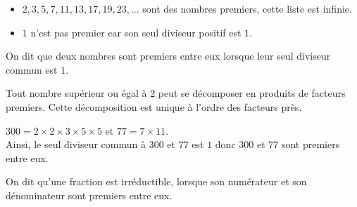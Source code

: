 \begin{Exemple}
\leavevmode\vspace{-\baselineskip}
\begin{itemize}[label=\textcolor{Couleur8}{$\bullet$}]
\item $2,3,5,7,11,13,17,19,23,...$ sont des nombres premiers, cette liste est infinie.
\item $1$ n'est pas premier car son seul diviseur positif est $1$.
\end{itemize}
\end{Exemple}

\begin{Définition}
On dit que deux nombres sont premiers entre eux lorsque leur seul
diviseur commun est $1$.
\end{Définition}

\newpage

\begin{Propriété}
Tout nombre supérieur ou égal à $2$ peut se décomposer en produits de facteurs premiers. Cette décomposition est unique à l'ordre des facteurs près.
\end{Propriété}

\begin{Exemple}
$300=2\times 2\times 3\times 5\times 5$ et $77=7\times 11$. \\Ainsi, le seul diviseur commun à $300$ et $77$ est $1$ donc $300$ et $77$ sont premiers entre eux.
\end{Exemple}

\begin{Propriété}
On dit qu'une fraction est irréductible, lorsque son numérateur et son dénominateur sont premiers entre eux.
\end{Propriété}

